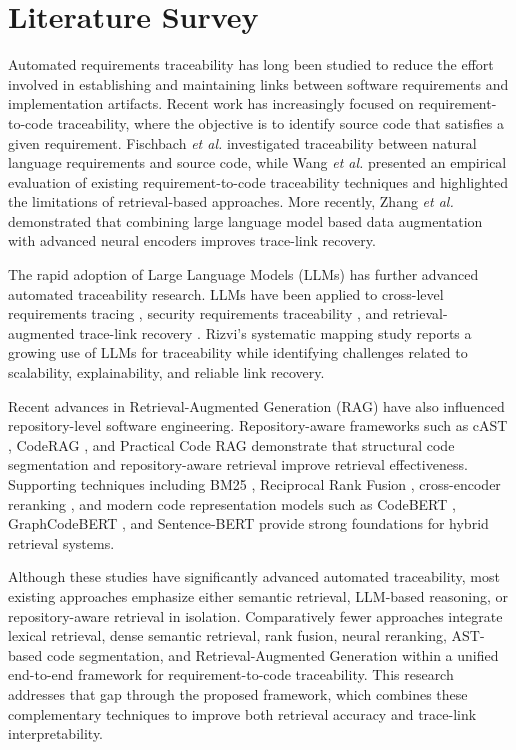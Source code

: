 \documentclass[conference]{IEEEtran}
\begin{document}
\section{Literature Survey}

Automated requirements traceability has long been studied to reduce the effort involved in establishing and maintaining links between software requirements and implementation artifacts. Recent work has increasingly focused on requirement-to-code traceability, where the objective is to identify source code that satisfies a given requirement. Fischbach \textit{et al.} \cite{ref4} investigated traceability between natural language requirements and source code, while Wang \textit{et al.} \cite{ref5} presented an empirical evaluation of existing requirement-to-code traceability techniques and highlighted the limitations of retrieval-based approaches. More recently, Zhang \textit{et al.} \cite{ref1} demonstrated that combining large language model based data augmentation with advanced neural encoders improves trace-link recovery.

The rapid adoption of Large Language Models (LLMs) has further advanced automated traceability research. LLMs have been applied to cross-level requirements tracing \cite{ref2}, security requirements traceability \cite{ref6}, and retrieval-augmented trace-link recovery \cite{ref7,ref8}. Rizvi's systematic mapping study \cite{ref3} reports a growing use of LLMs for traceability while identifying challenges related to scalability, explainability, and reliable link recovery.

Recent advances in Retrieval-Augmented Generation (RAG) have also influenced repository-level software engineering. Repository-aware frameworks such as cAST \cite{ref10}, CodeRAG \cite{ref11}, and Practical Code RAG \cite{ref19} demonstrate that structural code segmentation and repository-aware retrieval improve retrieval effectiveness. Supporting techniques including BM25 \cite{ref13}, Reciprocal Rank Fusion \cite{ref14}, cross-encoder reranking \cite{ref15}, and modern code representation models such as CodeBERT \cite{ref16}, GraphCodeBERT \cite{ref17}, and Sentence-BERT \cite{ref18} provide strong foundations for hybrid retrieval systems.

Although these studies have significantly advanced automated traceability, most existing approaches emphasize either semantic retrieval, LLM-based reasoning, or repository-aware retrieval in isolation. Comparatively fewer approaches integrate lexical retrieval, dense semantic retrieval, rank fusion, neural reranking, AST-based code segmentation, and Retrieval-Augmented Generation within a unified end-to-end framework for requirement-to-code traceability. This research addresses that gap through the proposed framework, which combines these complementary techniques to improve both retrieval accuracy and trace-link interpretability.
\end{document}
